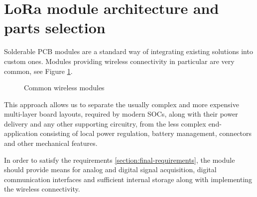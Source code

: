 \section{\label{section:module-architecture}LoRa module architecture and parts selection}
Solderable PCB modules are a standard way of integrating existing solutions into custom ones. Modules providing wireless connectivity in particular are very common, see Figure \ref{fig:wireless-modules}.

\begin{figure}
    \centering
    \caption{\label{fig:wireless-modules} Common wireless modules}
\end{figure}

This approach allows us to separate the usually complex and more expensive multi-layer board layouts, required by modern SOCs, along with their power delivery and any other supporting circuitry, from the less complex end-application consisting of local power regulation, battery management, connectors and other mechanical features.

In order to satisfy the requirements \ref{section:final-requirements}, the module should provide means for analog and digital signal acquisition, digital communication interfaces and sufficient internal storage along with implementing the wireless connectivity.

